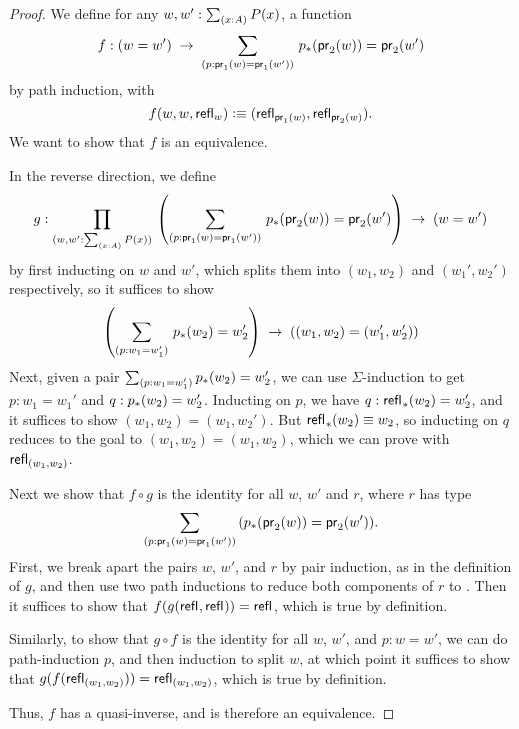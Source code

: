 \begin{proof}
We define for any $w,w':\sm{x:A}P(x)$, a function
\begin{equation*}
f: (w=w') \;\to\; \dsm{p:\proj{1}(w)=\proj{1}(w')} \trans{p}{\proj{2}(w)}=\proj{2}(w^\prime)
\end{equation*}
by path induction, with
\begin{equation*}
f(w,w,\mathsf{refl}_{w})\vcentcolon\equiv(\mathsf{refl}_{\mathsf{pr}_{1}(w)},\mathsf{refl}_{\mathsf{pr}_{2}(w)}).
\end{equation*}
We want to show that $f$ is an equivalence.

In the reverse direction, we define
\begin{equation*}
  g : \dprd{w,w':\sm{x:A}P(x)} \left(\dsm{p:\proj{1}(w)=\proj{1}(w')}\trans{p}{\proj{2}(w)}=\proj{2}(w^\prime)\right)
  \;\to\; (w=w')
\end{equation*}
by first inducting on $w$ and $w'$, which splits them into $(w_1,w_2)$ and
$(w_1',w_2')$ respectively, so it suffices to show 
\begin{equation*}
\left(\dsm{p:w_1 = w_1'}\trans{p}{w_2}=w_2^\prime\right) \;\to\; ((w_1,w_2)=(w_1',w_2'))
\end{equation*}
Next, given a pair $\sm{p:w_1 = w_1'}\trans{p}{w_2}=w_2^\prime$, we can
use $\Sigma$-induction to get $p : w_1 = w_1'$ and $q :
{p}_{*}\mathopen{}\left({w_2}\right)\mathclose{}=w_2^\prime$.  Inducting on $p$, we have $q :
{\mathsf{refl}_{}}_{*}\mathopen{}\left({w_2}\right)\mathclose{}=w_2^\prime$, and it suffices to show 
$(w_1,w_2)=(w_1,w_2')$.  But ${\mathsf{refl}_{}}_{*}\mathopen{}\left({w_2}\right)\mathclose{} \equiv w_2$, so
inducting on $q$ reduces to the goal to 
$(w_1,w_2)=(w_1,w_2)$, which we can prove with $\mathsf{refl}_{(w_1,w_2)}$.  

Next we show that $f \circ g$ is the identity for all $w$, $w'$ and
$r$, where $r$ has type
\[\dsm{p:\proj{1}(w)=\proj{1}(w')} (\trans{p}{\proj{2}(w)}=\proj{2}(w^\prime)).\]
First, we break apart the pairs $w$, $w'$, and $r$ by pair induction, as in the
definition of $g$, and then use two path inductions to reduce both components
of $r$ to .  Then it suffices to show that 
$f (g(\mathsf{refl}_{},\mathsf{refl}_{})) = \mathsf{refl}_{}$, which is true by definition.

Similarly, to show that $g \circ f$ is the identity for all $w$, $w'$,
and $p : w = w'$, we can do path-induction $p$, and then induction to
split $w$, at which point it suffices to show that
$g(f (\mathsf{refl}_{(w_1,w_2)})) = \mathsf{refl}_{(w_1,w_2)}$, which is true by
definition.

Thus, $f$ has a quasi-inverse, and is therefore an equivalence.  
\end{proof}

